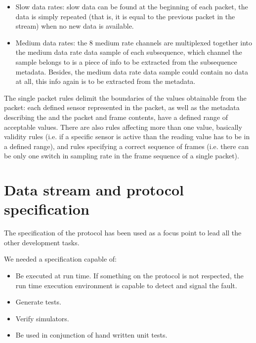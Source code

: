 \documentclass{article} \usepackage{times}
\begin{document}
\begin{itemize}
\item Slow data rates: slow data can be found at the beginning of each
  packet, the data is simply repeated (that is, it is equal to the
  previous packet in the stream) when no new data is available.
\item Medium data rates: the 8 medium rate channels are multiplexed
  together into the medium data rate data sample of each subsequence,
  which channel the sample belongs to is a piece of info to be
  extracted from the subsequence metadata. Besides, the medium data
  rate data sample could contain no data at all, this info again is to
  be extracted from the metadata.
\end{itemize}

The single packet rules delimit the boundaries of the values
obtainable from the packet: each defined sensor represented in the
packet, as well as the metadata describing the \STSB and the packet
and frame contents, have a defined range of acceptable values.  There
are also rules affecting more than one value, basically validity rules
(i.e. if a specific sensor is active than the reading value has to be
in a defined range), and rules specifying a correct sequence of frames
(i.e. there can be only one switch in sampling rate in the frame
sequence of a single packet).



\section{Data stream and protocol specification}
\label{sec:data_stream_and_protocol_specification}

The specification of the protocol has been used as a focus point to
lead all the other development tasks.

We needed a specification capable of:

\begin{itemize}
\item Be executed at run time. If something on the protocol is not
  respected, the run time execution environment is capable to detect
  and signal the fault.
\item Generate tests.
\item Verify simulators.
\item Be used in conjunction of hand written unit tests.
\end{itemize}
\end{document}
